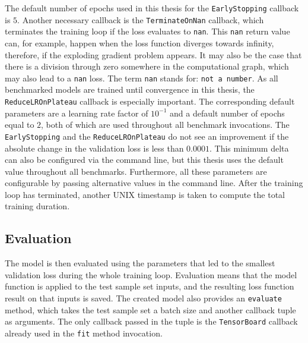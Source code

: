 \documentclass[draft,final]{vutinfth} %
\begin{document}
    The default number of epochs used in this thesis for the \texttt{EarlyStopping} callback is $5$.
    Another necessary callback is the \texttt{TerminateOnNan} callback, which terminates the training loop if the loss evaluates to \texttt{nan}.
    This \texttt{nan} return value can, for example, happen when the loss function diverges towards infinity, therefore, if the exploding gradient problem appears.
    It may also be the case that there is a division through zero somewhere in the computational graph, which may also lead to a \texttt{nan} loss.
    The term \texttt{nan} stands for: \texttt{not a number}.
    As all benchmarked models are trained until convergence in this thesis, the \texttt{ReduceLROnPlateau} callback is especially important.
    The corresponding default parameters are a learning rate factor of $10^{-1}$ and a default number of epochs equal to $2$, both of which are used throughout all benchmark invocations.
    The \texttt{EarlyStopping} and the \texttt{ReduceLROnPlateau} do not see an improvement if the absolute change in the validation loss is less than $0.0001$.
    This minimum delta can also be configured via the command line, but this thesis uses the default value throughout all benchmarks.
    Furthermore, all these parameters are configurable by passing alternative values in the command line.
    After the training loop has terminated, another UNIX timestamp is taken to compute the total training duration.

    \subsection{Evaluation}
    The model is then evaluated using the parameters that led to the smallest validation loss during the whole training loop.
    Evaluation means that the model function is applied to the test sample set inputs, and the resulting loss function result on that inputs is saved.
    The created model also provides an \texttt{evaluate} method, which takes the test sample set a batch size and another callback tuple as arguments.
    The only callback passed in the tuple is the \texttt{TensorBoard} callback already used in the \texttt{fit} method invocation.
\end{document}
